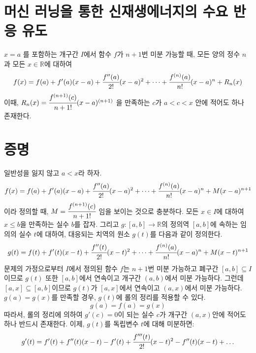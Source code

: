 \documentclass{article}
\begin{document}
\section{머신 러닝을 통한 신재생에너지의 수요 반응 유도}
$x=a$ 를 포함하는 개구간 $I$에서 함수 $f$가 $n+1$번 미분 가능할 때, 모든 양의 정수 $n$과 모든 $x \in \mathbb{R}$에 대하여
\begin{equation}
f(x)=f(a)+f'(a)(x-a)+\cfrac{f''(a)}{2!}(x-a)^2+\dots+\cfrac{f^{(n)}(a)}{n!}(x-a)^n+R_n(x)
\end{equation}
이때, $R_n(x)=\cfrac{f^{(n+1)}(c)}{n+1!}(x-a)^{(n+1)}$ 을 만족하는 $c$가 $a<c<x$ 안에 적어도 하나 존재한다.

\section{증명}
일반성을 잃지 않고 $a<x$라 하자.
\begin{equation}
f(x)=f(a)+f'(a)(x-a)+\cfrac{f''(a)}{2!}(x-a)^2+\dots+\cfrac{f^{(n)}(a)}{n!}(x-a)^n+M(x-a)^{n+1}
\end{equation}
이라 정의할 때, $M=\cfrac{f^{(n+1)}(c)}{n+1!}$ 임을 보이는 것으로 충분하다.\newline
모든 $x \in I$에 대하여 $x\leq b$을 만족하는 실수 $b$를 잡자. 그리고 $g : [a,b] \longrightarrow \mathbb{R}$의 정의역 $[a,b]$에 속하는 임의의 실수 $t$에 대하여, 대응되는 치역의 원소 $g(t)$를 다음과 같이 정의한다.
\begin{equation}
g(t)=f(t)+f'(t)(x-t)+\cfrac{f''(t)}{2!}(x-t)^2+\dots+\cfrac{f^{(n)}(a)}{n!}(x-a)^n+M(x-t)^{n+1}
\end{equation}
문제의 가정으로부터 $I$에서 정의된 함수 $f$는 $n+1$번 미분 가능하고 폐구간 $[a,b]\subseteq I$이므로 $g(t)$ 또한 $[a,b]$에서 연속이고 개구간 $(a,b)$에서 미분 가능하다.\newline
그런데 $[a,x] \subseteq [a,b]$이므로 $g(t)$가 $[a,x]$에서 연속이고 $(a,x)$에서 미분 가능하다. $g(a)=g(x)$를 만족할 경우, $g(t)$에 롤의 정리를 적용할 수 있다. \newline
\begin{equation}
g(a)=f(a)=g(x)
\end{equation}
따라서, 롤의 정리에 의하여 $g'(c)=0$이 되는 실수 $c$가 개구간 $(a,x)$안에 적어도 하나 반드시 존재한다. \newline
이제, $g(t)$를 독립변수 $t$에 대해 미분하면:
\begin{eqnarray}
g'(t)=f'(t)+f''(t)(x-t)-f'(t)+\cfrac{f'''(t)}{2!}(x-t)^2-f''(t)(x-t)+\dots
\end{eqnarray}
\end{document}
